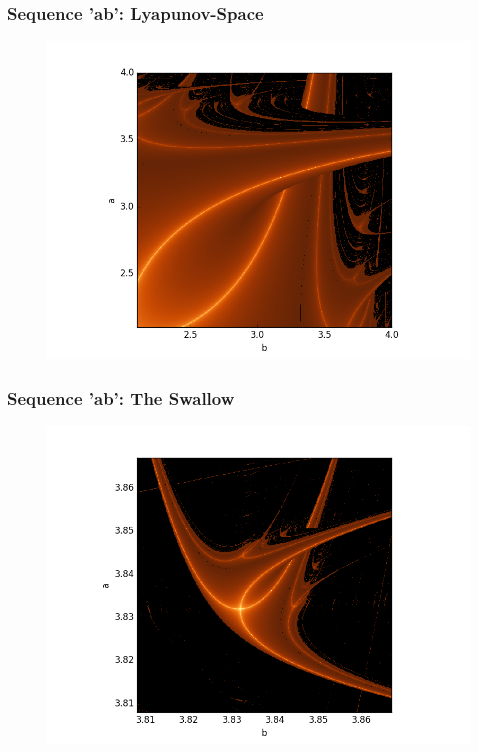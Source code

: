 \documentclass[ignorenonframetext]{beamer}
\begin{document}
\begin{frame}
\frametitle{Sequence 'ab': Lyapunov-Space}
\begin{figure}[htbp]
\vspace*{5pt}
\includegraphics[scale = 0.5]{pictures/ab_lyapunov-space.png}
\end{figure}
\end{frame}

\begin{frame}
\frametitle{Sequence 'ab': The Swallow}
\begin{figure}[htbp]
\includegraphics[scale = 0.5]{pictures/The-swallow_ab.png}
\end{figure}
\end{frame}
\end{document}
